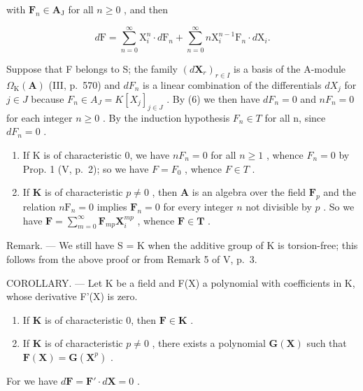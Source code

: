 with \(\mathbf{F}_n\in \mathbf{A}_{\mathrm{J}}\) for all \(n\geqslant 0\) , and then

\[
d \mathrm{F} = \sum_ {n = 0} ^ {\infty} \mathrm{X} _ {i} ^ {n} \cdot d \mathrm{F} _ {n} + \sum_ {n = 0} ^ {\infty} n \mathrm{X} _ {i} ^ {n - 1} \mathrm{F} _ {n} \cdot d \mathrm{X} _ {i}.\tag{6}
\]

Suppose that F belongs to S; the family \((d\mathbf{X}_{r})_{r\in I}\) is a basis of the A-module \(\Omega_{\mathrm{K}}(\mathbf{A})\) (III, p.~570) and \(dF_{n}\) is a linear combination of the differentials \(dX_{j}\) for \(j\in J\) because \(F_{n}\in A_{J}=K[X_{j}]_{j\in J}\) . By (6) we then have \(dF_{n}=0\) and \(nF_{n}=0\) for each integer \(n\geqslant0\) . By the induction hypothesis \(F_{n}\in T\) for all n, since \(dF_{n}=0\) .

\begin{enumerate}
\def\labelenumi{\alph{enumi})}
\item
  If K is of characteristic 0, we have \(nF_{n} = 0\) for all \(n \geqslant 1\) , whence \(F_{n} = 0\) by Prop. 1 (V, p.~2); so we have \(F = F_{0}\) , whence \(F \in T\) .
\item
  If \(\mathbf{K}\) is of characteristic \(p \neq 0\) , then \(\mathbf{A}\) is an algebra over the field \(\mathbf{F}_p\) and the relation \(n\mathrm{F}_n = 0\) implies \(\mathbf{F}_n = 0\) for every integer \(n\) not divisible by \(p\) . So we have \(\mathbf{F} = \sum_{m=0}^{\infty} \mathbf{F}_{mp} \mathbf{X}_i^{mp}\) , whence \(\mathbf{F} \in \mathbf{T}\) .
\end{enumerate}

Remark. --- We still have S = K when the additive group of K is torsion-free; this follows from the above proof or from Remark 5 of V, p.~3.

COROLLARY. --- Let K be a field and F(X) a polynomial with coefficients in K, whose derivative F'(X) is zero.

\begin{enumerate}
\def\labelenumi{\alph{enumi})}
\item
  If \(\mathbf{K}\) is of characteristic 0, then \(\mathbf{F} \in \mathbf{K}\) .
\item
  If \(\mathbf{K}\) is of characteristic \(p \neq 0\) , there exists a polynomial \(\mathbf{G}(\mathbf{X})\) such that \(\mathbf{F}(\mathbf{X}) = \mathbf{G}(\mathbf{X}^p)\) .
\end{enumerate}

For we have \(d\mathbf{F} = \mathbf{F}' \cdot d\mathbf{X} = 0\) .

